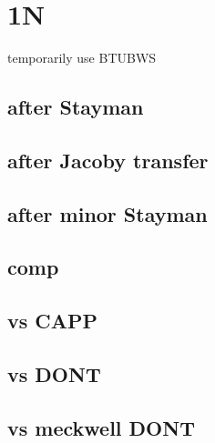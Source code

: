 \section{1N}

temporarily use BTUBWS


\subsection{after Stayman}


\subsection{after Jacoby transfer}


\subsection{after minor Stayman}


\subsection{comp}


\subsection{vs CAPP}


\subsection{vs DONT}

\subsection{vs meckwell DONT}


